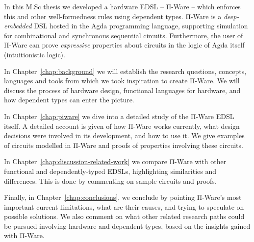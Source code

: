     In this M.Sc thesis we developed a hardware \ac{EDSL} – Π-Ware – which enforces this and other
    well-formedness rules using dependent types.
    Π-Ware is a \emph{deep-embedded} \ac{DSL} hosted in the Agda programming language,
    supporting simulation for combinational and synchronous sequential circuits.
    Furthermore, the user of Π-Ware can prove \emph{expressive} properties about circuits in the logic
    of Agda itself (intuitionistic logic).

    In Chapter~\ref{chap:background} we will establish the research questions, concepts,
    languages and tools from which we took inspiration to create Π-Ware.
    We will discuss the process of hardware design, functional languages for hardware,
    and how dependent types can enter the picture.

    In Chapter~\ref{chap:piware} we dive into a detailed study of the Π-Ware \ac{EDSL} itself.
    A detailed account is given of how Π-Ware works currently,
    what design decisions were involved in its development, and how to use it.
    We give examples of circuits modelled in Π-Ware and proofs of properties involving these circuits.

    In Chapter~\ref{chap:discussion-related-work} we compare Π-Ware with other functional
    and dependently-typed \acp{EDSL}, highlighting similarities and differences.
    This is done by commenting on sample circuits and proofs.

    Finally, in Chapter~\ref{chap:conclusions}, we conclude by pointing Π-Ware's most important
    current limitations, what are their causes, and trying to speculate on possible solutions.
    We also comment on what other related research paths could be pursued involving
    hardware and dependent types, based on the insights gained with Π-Ware.

